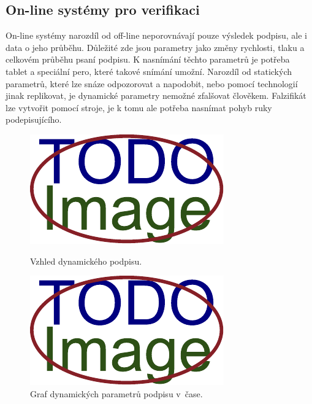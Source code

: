 \subsection{On-line systémy pro verifikaci} %
On-line systémy narozdíl od off-line neporovnávají pouze výsledek podpisu, ale i data o jeho průběhu.         %
Důležité zde jsou parametry jako změny rychlosti, tlaku a celkovém průběhu psaní podpisu.                     %
K nasnímání těchto parametrů je potřeba tablet a speciální pero, které takové snímání umožní.                 %
Narozdíl od statických parametrů, které lze snáze odpozorovat a napodobit,                                    %
nebo pomocí technologií jinak replikovat, je dynamické parametry nemožné zfalšovat člověkem.                  %
Falzifikát lze vytvořit pomocí stroje, je k tomu ale potřeba nasnímat pohyb ruky podepisujícího.              %

\begin{figure}[h]
  \centering
  \begin{minipage}{0.45\textwidth}
      \centering
      \includegraphics[width=\textwidth]{obrazky-figures/placeholder.pdf}
      \caption{Vzhled dynamického podpisu.}
      \label{fig:first-image}
  \end{minipage}\hfill
  \begin{minipage}{0.45\textwidth}
      \centering
      \includegraphics[width=\textwidth]{obrazky-figures/placeholder.pdf}
      \caption{Graf dynamických parametrů podpisu v~čase.}
      \label{fig:second-image}
  \end{minipage}
\end{figure}

